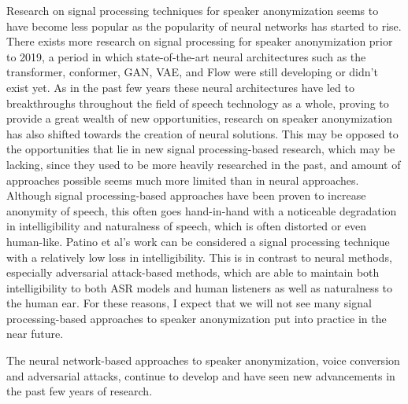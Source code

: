 \documentclass{Interspeech2024}
\begin{document}
Research on signal processing techniques for speaker anonymization seems to have become less popular as the popularity of neural networks has started to rise.
There exists more research on signal processing for speaker anonymization prior to 2019, a period in which state-of-the-art neural architectures such as the transformer, conformer, GAN, VAE, and Flow were still developing or didn't exist yet.
As in the past few years these neural architectures have led to breakthroughs throughout the field of speech technology as a whole, proving to provide a great wealth of new opportunities, research on speaker anonymization has also shifted towards the creation of neural solutions.
This may be opposed to the opportunities that lie in new signal processing-based research, which may be lacking, since they used to be more heavily researched in the past, and amount of approaches possible seems much more limited than in neural approaches.
Although signal processing-based approaches have been proven to increase anonymity of speech, this often goes hand-in-hand with a noticeable degradation in intelligibility and naturalness of speech, which is often distorted or even human-like.
Patino et al's \cite{patino_2021_mcadams} work can be considered a signal processing technique with a relatively low loss in intelligibility.
This is in contrast to neural methods, especially adversarial attack-based methods, which are able to maintain both intelligibility to both ASR models and human listeners as well as naturalness to the human ear.
For these reasons, I expect that we will not see many signal processing-based approaches to speaker anonymization put into practice in the near future.

The neural network-based approaches to speaker anonymization, voice conversion and adversarial attacks, continue to develop and have seen new advancements in the past few years of research.
\end{document}
